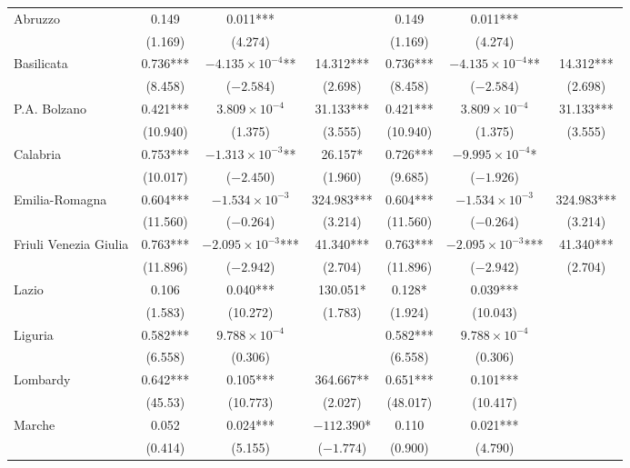 \documentclass[12pt]{article}
\begin{document}
\begin{appendices}
\begin{longtable}{@{}lcccccc@{}}
            Abruzzo & 0.149 & 0.011*** &  & 0.149 & 0.011*** &  \\ 
             & (1.169) & (4.274) &  & (1.169) & (4.274) &  \\ 
            Basilicata & 0.736*** & $-4.135 \times 10^{-4}$** & 14.312*** & 0.736*** & $-4.135 \times 10^{-4}$** & 14.312*** \\ 
             & (8.458) & ($-2.584$) & (2.698) & (8.458) & ($-2.584$) & (2.698) \\ 
            P.A. Bolzano & 0.421*** & $3.809 \times 10^{-4}$ & 31.133*** & 0.421*** & $3.809 \times 10^{-4}$ & 31.133*** \\ 
             & (10.940) & (1.375) & (3.555) & (10.940) & (1.375) & (3.555) \\ 
            Calabria & 0.753*** & $-1.313 \times 10^{-3}$** & 26.157* & 0.726*** & $-9.995 \times 10^{-4}$* &  \\
             & (10.017) & ($-2.450$) & (1.960) & (9.685) & ($-1.926$) &  \\ 
            Emilia-Romagna & 0.604*** & $-1.534 \times 10^{-3}$ & 324.983*** & 0.604*** & $-1.534 \times 10^{-3}$ & 324.983*** \\ 
             & (11.560) & ($-0.264$) & (3.214) & (11.560) & ($-0.264$) & (3.214) \\ 
            Friuli Venezia Giulia & 0.763*** & $-2.095 \times 10^{-3}$*** & 41.340*** & 0.763*** & $-2.095 \times 10^{-3}$*** & 41.340*** \\ 
             & (11.896) & ($-2.942$) & (2.704) & (11.896) & ($-2.942$) & (2.704) \\ 
            Lazio & 0.106 & 0.040*** & 130.051* & 0.128* & 0.039*** &  \\ 
             & (1.583) & (10.272) & (1.783) & (1.924) & (10.043) &  \\ 
            Liguria & 0.582*** & $9.788 \times 10^{-4}$ &  & 0.582*** & $9.788 \times 10^{-4}$ &  \\ 
             & (6.558) & (0.306) &  & (6.558) & (0.306) &  \\ 
            Lombardy & 0.642*** & 0.105*** & 364.667** & 0.651*** & 0.101*** &  \\ 
             & (45.53) & (10.773) & (2.027) & (48.017) & (10.417) &  \\
            Marche & 0.052 & 0.024*** & $-112.390$* & 0.110 & 0.021*** &  \\ 
             & (0.414) & (5.155) & ($-1.774$) & (0.900) & (4.790) &  \\ 

\end{longtable}
\end{appendices}
\end{document}
